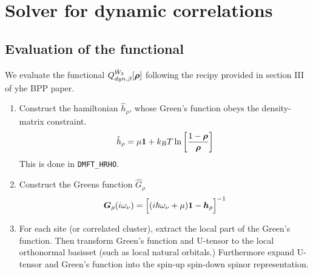 \documentclass[11pt,a4paper]{report}
\begin{document}
\section{Solver for dynamic correlations}
\subsection{Evaluation of the functional}
We evaluate the functional $Q^{\hat{W}_2}_{dyn,\beta}[\bm{\rho}]$
following the recipy provided in section III of yhe BPP
paper\cite{bloechl13_prb88_25139}.
\begin{enumerate}
\item Construct the hamiltonian $\hat{h}_\rho$, whose Green's function
  obeys the density-matrix constraint.
\begin{eqnarray}
\hat{h}_\rho=\mu\bm{1}+k_BT\ln\left[\frac{1-\bm{\rho}}{\bm{\rho}}\right]
\end{eqnarray}
This is done in \verb|DMFT_HRHO|.
%
\item Construct the Greens function $\hat{G}_\rho$
\begin{eqnarray}
\bm{G}_\rho(i\omega_\nu)=\Bigl[(i\hbar\omega_\nu+\mu)\bm{1}-\bm{h}_\rho
\Bigr]^{-1}
\end{eqnarray}
%
\item For each site (or correlated cluster), extract the local part of
  the Green's function. Then transform Green's function and U-tensor
  to the local orthonormal basisset (such as local natural orbitals.)
  Furthermore expand U-tensor and Green's function into the spin-up
  spin-down spinor representation.


\end{enumerate}
\end{document}
